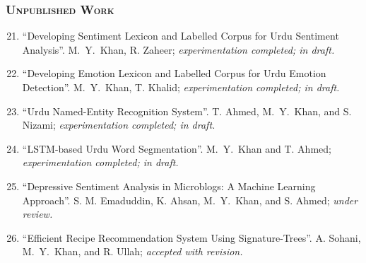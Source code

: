 \documentclass[a4paper, 10pt]{article}
\begin{document}
\subsubsection*{\textsc{ Unpublished Work}}
\begin{enumerate}
\setcounter{enumi}{20}
\itemsep-4pt

\item ``Developing Sentiment Lexicon and Labelled Corpus for Urdu Sentiment Analysis''. \textcolor{NavyBlue}{M.~Y.~Khan}, R. Zaheer; \emph{\small experimentation completed; in draft.}

\item ``Developing Emotion Lexicon and Labelled Corpus for Urdu Emotion Detection''. \textcolor{NavyBlue}{M.~Y.~Khan}, T. Khalid; \emph{\small experimentation completed; in draft.}

\item ``Urdu Named-Entity Recognition System''. T. Ahmed, \textcolor{NavyBlue}{M.~Y.~Khan}, and S. Nizami; \emph{\small experimentation completed; in draft.}

\item ``LSTM-based Urdu Word Segmentation''. \textcolor{NavyBlue}{M.~Y.~Khan} and T. Ahmed; \emph{\small experimentation completed; in draft.}

\item ``Depressive Sentiment Analysis in Microblogs: A Machine Learning Approach''. S. M. Emaduddin, K. Ahsan, \textcolor{NavyBlue}{M.~Y.~Khan}, and S. Ahmed; \emph{\small under review.}

\item ``Efficient Recipe Recommendation System Using Signature-Trees''. A. Sohani, \textcolor{NavyBlue}{M.~Y.~Khan}, and R. Ullah;
\emph{\small accepted with revision.}




\end{enumerate}
\end{document}
